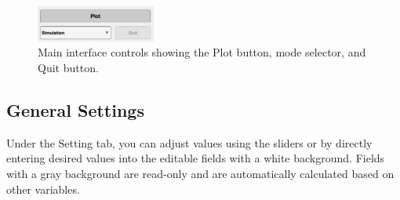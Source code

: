 \begin{figure}[H]
    \centering
    \includegraphics[width=0.35\textwidth]{figs/mainapp1.png}
    \caption{Main interface controls showing the Plot button, mode selector, and Quit button.}
    \label{fig:main1}
\end{figure}

\subsection{General Settings}
Under the Setting tab, you can adjust values using the sliders or by directly entering desired values into the editable fields with a white background. Fields with a gray background are read-only and are automatically calculated based on other variables.

